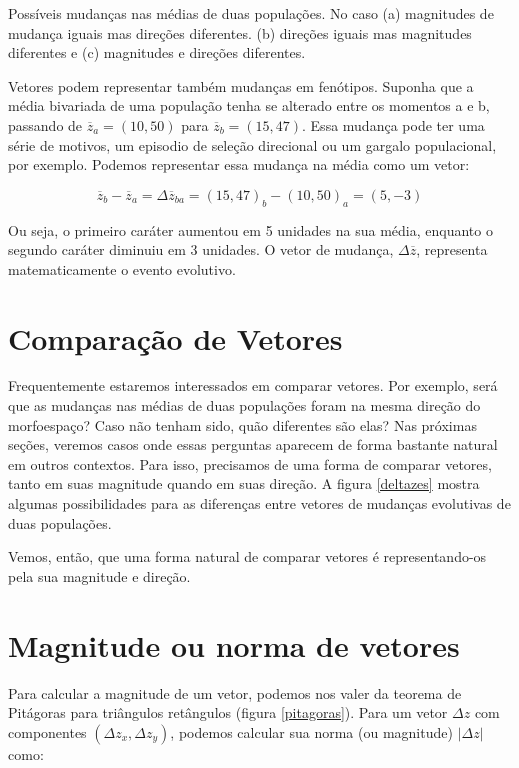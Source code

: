 \documentclass[portuges,]{tufte-handout}
\begin{document}
\begin{marginfigure}
\caption{Possíveis mudanças nas médias de duas populações. No
caso (a) magnitudes de mudança iguais mas direções diferentes. (b)
direções iguais mas magnitudes diferentes e (c) magnitudes e direções
diferentes.}
\label{deltazes}
\end{marginfigure}

Vetores podem representar também mudanças em fenótipos. Suponha que a
média bivariada de uma população tenha se alterado entre os momentos a e
b, passando de \(\overline z_a=(10, 50)\) para
\(\overline z_b=(15, 47)\). Essa mudança pode ter uma série de motivos,
um episodio de seleção direcional ou um gargalo populacional, por
exemplo. Podemos representar essa mudança na média como um vetor:

\[
\overline z_b - \overline z_a = \Delta \overline z_{ba} = (15, 47)_b - (10, 50)_a = (5, -3)
\]

Ou seja, o primeiro caráter aumentou em 5 unidades na sua média,
enquanto o segundo caráter diminuiu em 3 unidades. O vetor de mudança,
\(\Delta \overline z\), representa matematicamente o evento evolutivo.

\section{Comparação de Vetores}\label{comparauxe7uxe3o-de-vetores}

Frequentemente estaremos interessados em comparar vetores. Por exemplo,
será que as mudanças nas médias de duas populações foram na mesma
direção do morfoespaço? Caso não tenham sido, quão diferentes são elas?
Nas próximas seções, veremos casos onde essas perguntas aparecem de
forma bastante natural em outros contextos. Para isso, precisamos de uma
forma de comparar vetores, tanto em suas magnitude quando em suas
direção. A figura \ref{deltazes} mostra algumas possibilidades para as
diferenças entre vetores de mudanças evolutivas de duas populações.

Vemos, então, que uma forma natural de comparar vetores é
representando-os pela sua magnitude e direção.

\section{Magnitude ou norma de
vetores}\label{magnitude-ou-norma-de-vetores}

Para calcular a magnitude de um vetor, podemos nos valer da teorema de
Pitágoras para triângulos retângulos (figura \ref{pitagoras}). Para um
vetor \(\Delta z\) com componentes \((\Delta z_x, \Delta z_y)\), podemos
calcular sua norma (ou magnitude) \(|\Delta z|\) como:
\end{document}
